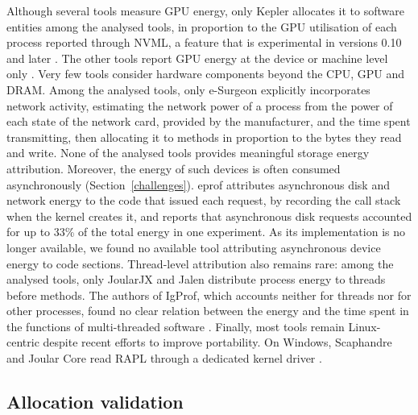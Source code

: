 \documentclass[
  acmsmall,
  screen,
  review,
  xcolor={dvipsnames,usenames}
]{acmart}
\begin{document}
Although several tools measure GPU energy, only Kepler allocates it to software entities among the analysed tools, in proportion to the GPU utilisation of each process reported through NVML, a feature that is experimental in versions 0.10 and later \cite{SustainablecomputingioKepler2026}. The other tools report GPU energy at the device or machine level only \cite{noureddinePowerJoularJoularJXMultiPlatform2022,DocsgreencodingioDocsMeasuring}. Very few tools consider hardware components beyond the CPU, GPU and DRAM. Among the analysed tools, only e-Surgeon \cite{noureddineMonitoringEnergyHotspots2015} explicitly incorporates network activity, estimating the network power of a process from the power of each state of the network card, provided by the manufacturer, and the time spent transmitting, then allocating it to methods in proportion to the bytes they read and write. None of the analysed tools provides meaningful storage energy attribution. Moreover, the energy of such devices is often consumed asynchronously (Section~\ref{challenges}). eprof \cite{schubertProfilingSoftwareEnergy2012} attributes asynchronous disk and network energy to the code that issued each request, by recording the call stack when the kernel creates it, and reports that asynchronous disk requests accounted for up to 33\% of the total energy in one experiment. As its implementation is no longer available, we found no available tool attributing asynchronous device energy to code sections. Thread-level attribution also remains rare: among the analysed tools, only JoularJX \cite{noureddinePowerJoularJoularJXMultiPlatform2022} and Jalen \cite{noureddineMonitoringEnergyHotspots2015} distribute process energy to threads before methods. The authors of IgProf, which accounts neither for threads nor for other processes, found no clear relation between the energy and the time spent in the functions of multi-threaded software \cite{khanEnergyProfilingUsing2015}. Finally, most tools remain Linux-centric despite recent efforts to improve portability. On Windows, Scaphandre and Joular Core read RAPL through a dedicated kernel driver \cite{Scaphandre,OverviewJoularCore}.

\subsection{Allocation validation}
\end{document}
